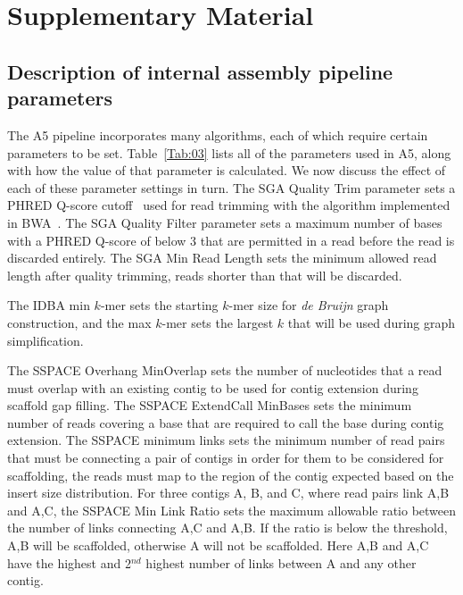 \documentclass{bioinfo}
\begin{document}





\section{Supplementary Material}
\subsection{Description of internal assembly pipeline parameters}

The A5 pipeline incorporates many algorithms, each of which require certain parameters to be set.
Table~\ref{Tab:03} lists all of the parameters used in A5, along with how the value
of that parameter is calculated. We now discuss the effect of each of these parameter settings in turn.  
The SGA Quality Trim parameter sets a PHRED Q-score cutoff~\citep{Ewing1998} used for read trimming with the algorithm
implemented in BWA~\citep{bwa}. The SGA Quality Filter parameter sets a maximum number of bases
with a PHRED Q-score of below 3 that are permitted in a read before the read is discarded entirely.
The SGA Min Read Length sets the minimum allowed read length after quality trimming, reads shorter
than that will be discarded.

The IDBA min $k$-mer sets the starting $k$-mer size for \emph{de Bruijn} graph construction, and the max $k$-mer sets
the largest $k$ that will be used during graph simplification.

The SSPACE Overhang MinOverlap sets the number of nucleotides that a read must overlap with an existing
contig to be used for contig extension during scaffold gap filling. The SSPACE ExtendCall MinBases sets the minimum
number of reads covering a base that are required to call the base during contig extension. The SSPACE minimum
links sets the minimum number of read pairs that must be connecting a pair of contigs in order for them to be considered
for scaffolding, the reads must map to the region of the contig expected based on the insert size distribution.
For three contigs A, B, and C, where read pairs link A,B and A,C, the SSPACE Min Link Ratio sets the 
maximum allowable ratio between the number of links connecting A,C and A,B. If the ratio is below the threshold,
A,B will be scaffolded, otherwise A will not be scaffolded. Here A,B and A,C have the highest and 2$^{nd}$ highest number
of links between A and any other contig.
\end{document}
